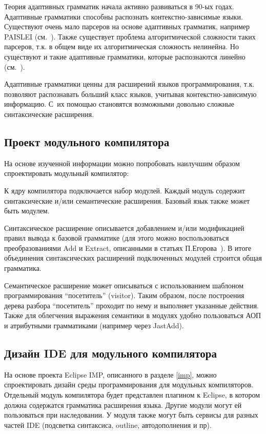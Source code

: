 \documentclass[a4paper,12pt,titlepage]{extarticle}
\begin{document}
Теория адаптивных грамматик начала активно развиваться в 90-ых годах.
Адаптивные грамматики способны распознать контекстно-зависимые языки.
Существуют очень мало парсеров на основе адаптивных грамматик, например PAISLEI
(см.~\cite{paislei}). Также существует проблема алгоритмической сложности таких
парсеров, т.к. в общем виде их алгоритмическая сложность нелинейна. Но
существуют и такие адаптивные грамматики, которые распознаются линейно
(см.~\cite{paislei}).

Адаптивные грамматики ценны для расширений языков программирования, т.к.
позволяют распознавать больший класс языков, учитывая контекстно-зависимую
информацию. С~их помощью становятся возможными довольно сложные синтаксические
расширения.

\subsection{Проект модульного компилятора}
На основе изученной информации можно попробовать наилучшим образом
спроектировать модульный компилятор:

К ядру компилятора подключается набор модулей. Каждый модуль содержит
синтаксические и/или семантические расширения. Базовый язык также может быть
модулем.

Синтаксическое расширение описывается добавлением и/или модификацией правил
вывода к базовой грамматике (для этого можно воспользоваться преобразованиями
Add и Extract, описанными в статьях П.Егорова~\cite{Egor}). В итоге объединения
синтаксических расширений подключенных модулей строится общая грамматика.

Семантическое расширение может описываться с использованием шаблоном
программирования ``посетитель'' (visitor). Таким образом, после построения
дерева разбора ``посетитель'' проходит по нему и выполняет указанные действия.
Также для облегчения выражения семантики в модулях удобно пользоваться АОП и
атрибутными грамматиками (например через JastAdd).

\subsection{Дизайн IDE для модульного компилятора}

На основе проекта Eclipse IMP, описанного в разделе \ref{imp}, можно
спроектировать дизайн среды программирования для модульных компиляторов.
Отдельный модуль компилятора будет представлен плагином к Eclipse, в котором
должна содержатся грамматика расширения языка. Другие модули могут ей
пользоваться при наследовании. У модуля также могут быть сервисы для разных
частей IDE (подсветка синтаксиса, outline, автодополнения и пр).
\end{document}
